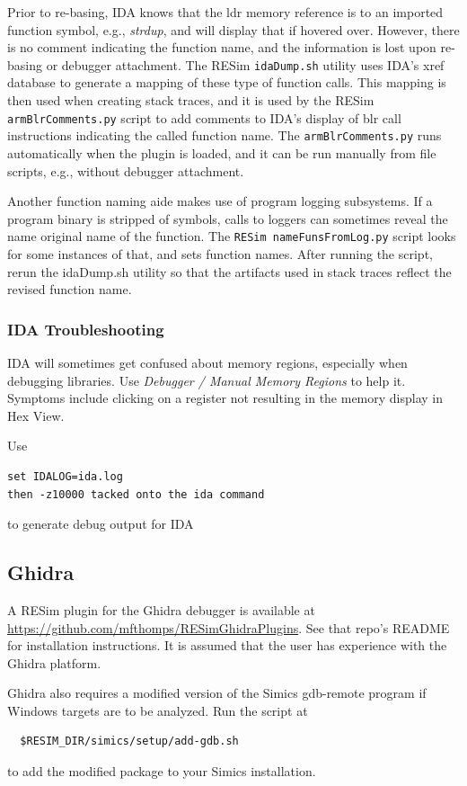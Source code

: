 \documentclass[titlepage]{article}
\begin{document}
Prior to re-basing, IDA knows that the ldr memory reference is to an imported function symbol, e.g., \textit{strdup}, and
will display that if hovered over.  However, there is no comment indicating the function name, and the information is lost
upon re-basing or debugger attachment. 
The RESim {\tt idaDump.sh} utility uses IDA's xref database to generate a mapping of these type of function calls.
This mapping is then used when creating stack traces, and it is used by the RESim {\tt armBlrComments.py} script to add comments
to IDA's display of blr call instructions indicating the called function name.  The {\tt armBlrComments.py} runs automatically when the
plugin is loaded, and it can be run manually from file scripts, e.g., without debugger attachment.

Another function naming aide makes use of program logging subsystems.  If a program binary is stripped of symbols, calls to loggers can sometimes
reveal the name original name of the function.  The {\tt RESim nameFunsFromLog.py} script looks for some instances of that, and sets function names.
After running the script, rerun the idaDump.sh utility so that the artifacts used in stack traces reflect the revised function name.

\subsubsection{IDA Troubleshooting}
IDA will sometimes get confused about memory regions, especially when debugging libraries.  Use \textit{Debugger / Manual Memory Regions} to help it.
Symptoms include clicking on a register not resulting in the memory display in Hex View.

Use
\begin{verbatim}
set IDALOG=ida.log
then -z10000 tacked onto the ida command
\end{verbatim}
\noindent to generate debug output for IDA

\subsection{Ghidra}
\label{ghidra}
A RESim plugin for the Ghidra debugger is available at \url{https://github.com/mfthomps/RESimGhidraPlugins}.
See that repo's README for installation instructions.  It is assumed that the user has experience with the Ghidra platform.

Ghidra also requires a modified version of the Simics gdb-remote program if Windows targets are to be
analyzed.  Run the script at
\begin{verbatim}
  $RESIM_DIR/simics/setup/add-gdb.sh
\end{verbatim}
to add the modified package to your Simics installation.
\end{document}
